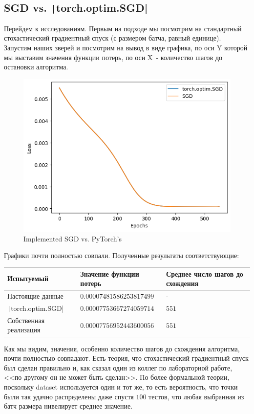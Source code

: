 \documentclass[12pt, a4paper, oneside, final]{article}
\begin{document}
	\subsection*{SGD vs. \texttt|torch.optim.SGD|}
	Перейдем к исследованиям.
	Первым на подходе мы посмотрим на стандартный стохастический градиентный спуск (с размером батча, равный единице).
	Запустим наших зверей и посмотрим на вывод в виде графика, по оси Y которой мы выставим значения функции потерь, по оси X~- количество шагов до остановки алгоритма.
	\begin{figure}[H]
		\centering
		\includegraphics[scale = 1]{Image/T1_SGD_vs_torch_optim_SGD.png}
		\caption*{Implemented SGD vs. PyTorch's}
	\end{figure}
	Графики почти полностью совпали.
	Полученные результаты соответствующие:
	\begin{table}[H]
		\centering
		\begin{tabular}{l|l|l}
			Испытуемый & Значение функции потерь & Среднее число шагов до схождения \\ \hline
			Настоящие данные & $0.00007481586253817499$ & - \\
			\texttt|torch.optim.SGD| & $0.00007753667274059714$ & $551$ \\
			Собственная реализация & $0.00007756952443600056$ & $551$
		\end{tabular}
	\end{table}
	Как мы видим, значения, особенно количество шагов до схождения алгоритма, почти полностью совпадают.
	Есть теория, что стохастический градиентный спуск был сделан правильно и, как сказал один из коллег по лабораторной работе, <<по другому он не может быть сделан>>.
	По более формальной теории, поскольку dataset используется один и тот же, то есть вероятность, что точки были так удачно распределены даже спустя $100$ тестов, что любая выбранная из батч размера нивелирует среднее значение.
\end{document}
